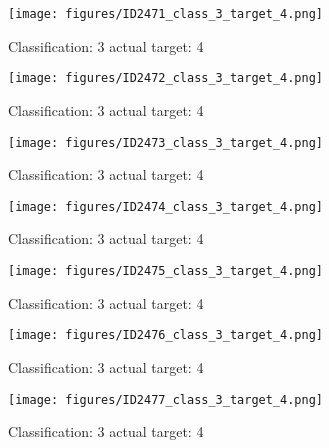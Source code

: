 \begin{figure}[h!]
\begin{center}
\texttt{[image: figures/ID2471\_class\_3\_target\_4.png]}
\end{center}
\caption{ Classification: 3 actual target: 4}
\label{fig:ID2471_class_3_target_4}
\end{figure}
\begin{figure}[h!]
\begin{center}
\texttt{[image: figures/ID2472\_class\_3\_target\_4.png]}
\end{center}
\caption{ Classification: 3 actual target: 4}
\label{fig:ID2472_class_3_target_4}
\end{figure}
\begin{figure}[h!]
\begin{center}
\texttt{[image: figures/ID2473\_class\_3\_target\_4.png]}
\end{center}
\caption{ Classification: 3 actual target: 4}
\label{fig:ID2473_class_3_target_4}
\end{figure}
\begin{figure}[h!]
\begin{center}
\texttt{[image: figures/ID2474\_class\_3\_target\_4.png]}
\end{center}
\caption{ Classification: 3 actual target: 4}
\label{fig:ID2474_class_3_target_4}
\end{figure}
\begin{figure}[h!]
\begin{center}
\texttt{[image: figures/ID2475\_class\_3\_target\_4.png]}
\end{center}
\caption{ Classification: 3 actual target: 4}
\label{fig:ID2475_class_3_target_4}
\end{figure}
\begin{figure}[h!]
\begin{center}
\texttt{[image: figures/ID2476\_class\_3\_target\_4.png]}
\end{center}
\caption{ Classification: 3 actual target: 4}
\label{fig:ID2476_class_3_target_4}
\end{figure}
\begin{figure}[h!]
\begin{center}
\texttt{[image: figures/ID2477\_class\_3\_target\_4.png]}
\end{center}
\caption{ Classification: 3 actual target: 4}
\label{fig:ID2477_class_3_target_4}
\end{figure}

